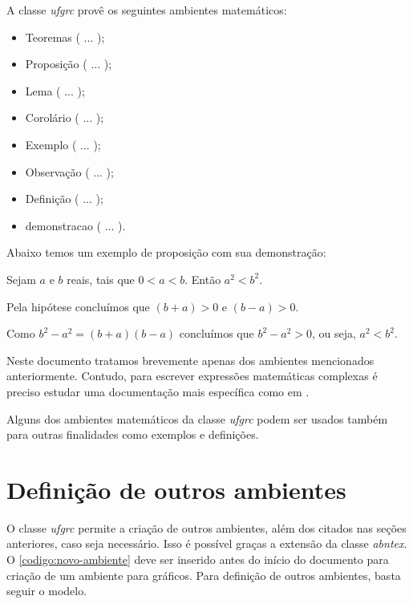 A classe \textit{ufgrc} provê os seguintes ambientes matemáticos:
\begin{itemize}
 \item Teoremas ( ... );
 \item Proposição ( ... );
 \item Lema ( ... );
 \item Corolário ( ... );
 \item Exemplo ( ... );
 \item Observação ( ... );
 \item Definição ( ... );
 \item demonstracao ( ... ).
\end{itemize}

Abaixo temos um exemplo de proposição com sua demonstração:
\begin{proposicao}
 Sejam $a$ e $b$ reais, tais que $0<a<b$. Então $a^2<b^2$.
\end{proposicao}
\begin{demonstracao}
 Pela hipótese concluímos que $(b+a)>0$ e $(b-a)>0$.

Como $b^2-a^2=(b+a)(b-a)$ concluímos que $b^2-a^2>0$, ou seja, $a^2<b^2$.
\end{demonstracao}

Neste documento tratamos brevemente apenas dos ambientes mencionados anteriormente. Contudo, para escrever expressões matemáticas complexas é preciso estudar uma documentação mais específica como em .

Alguns dos ambientes matemáticos da classe \textit{ufgrc} podem ser usados também para outras finalidades como exemplos e definições.


\section{Definição de outros ambientes}
\label{secao:outros-ambientes}

O classe \textit{ufgrc} permite a criação de outros ambientes, além dos citados nas seções anteriores, caso seja necessário. Isso é possível graças a extensão da classe \textit{abntex}. O \autoref{codigo:novo-ambiente} deve ser inserido antes do início do documento para criação de um ambiente para gráficos. Para definição de outros ambientes, basta seguir o modelo.


